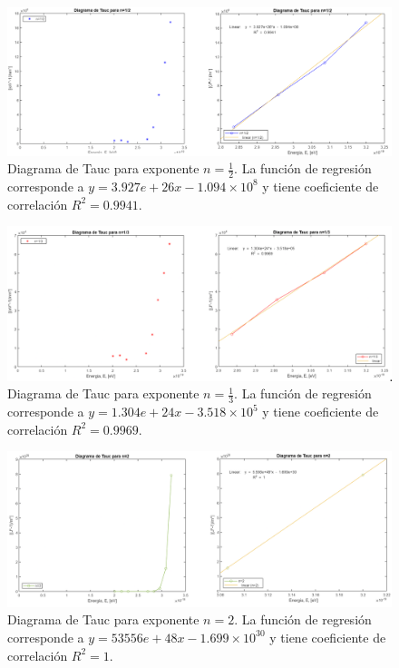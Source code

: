 \documentclass[article]{article}
\begin{document}
        \begin{figure}[H]
            \centering
            \includegraphics[width=0.75\linewidth]{1_2-gap.png}
            \caption{ Diagrama de Tauc para exponente $ n=\frac{1}{2}$. La función de regresión corresponde a $y=3.927e+26x-1.094\times10^{8}$ y tiene coeficiente de correlación $R^2=0.9941$.}
            \label{fig:gap 1}
        \end{figure}
    
    \begin{figure}[H]
        \centering
        \includegraphics[width=0.75\linewidth]{1_3-gap.png}
            \caption{ Diagrama de Tauc para exponente $ n=\frac{1}{3}$.  La función de regresión corresponde a $y=1.304e+24x-3.518\times10^{5}$ y tiene coeficiente de correlación $R^2=0.9969$.}
        \label{Fig:gap 2}
    \end{figure}
    
    \begin{figure}[H]
        \centering
        \includegraphics[width=0.75\linewidth]{2-gap.png}
        \caption{ Diagrama de Tauc para exponente $ n=2$. La función de regresión corresponde a $y=53556e+48x-1.699\times10^{30}$ y tiene coeficiente de correlación $R^2=1$.}
        \label{fig:gap 3}
    \end{figure}
\end{document}
